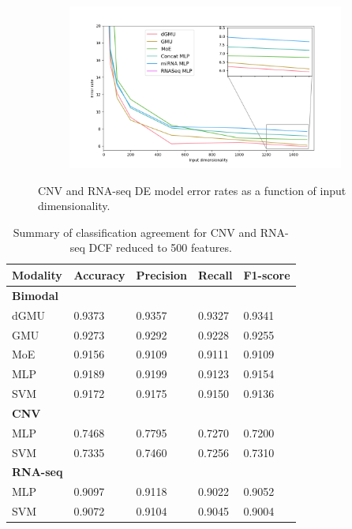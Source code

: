 \begin{figure}[H]
     \centering
     \begin{subfigure}[b]{\textwidth}
         \centering
         \includegraphics[width=\textwidth]{img/c_r/exp82.png}
     \end{subfigure}
        \caption{CNV and RNA-seq DE model error rates as a function of input dimensionality.}
        \label{fig:c_r_dcf_exp82}
\end{figure}

\begin{table}[H]
   \caption{Summary of classification agreement for CNV and RNA-seq DCF reduced to 500 features.} 
   \small %
   \centering %
   \begin{tabular}{lllll} %
   \toprule[\heavyrulewidth]\toprule[\heavyrulewidth]
   \textbf{Modality} & \textbf{Accuracy} & \textbf{Precision} & \textbf{Recall} & \textbf{F1-score} \\ 
   \midrule
   \multicolumn{1}{l}{\textbf{Bimodal}} \\
        dGMU & 0.9373 & 0.9357	& 0.9327 & 0.9341\\
        GMU  & 0.9273&	0.9292&	0.9228&	0.9255\\
        MoE  & 0.9156 &	0.9109 & 0.9111 & 0.9109\\
        MLP  & 0.9189 &	0.9199 & 0.9123 & 0.9154\\
        SVM  & 0.9172 &	0.9175 & 0.9150 & 0.9136\\
   \midrule
   \multicolumn{1}{l}{\textbf{CNV}} \\
        MLP  & 0.7468 &	0.7795 & 0.7270 & 0.7200\\
        SVM  & 0.7335 &	0.7460 & 0.7256 & 0.7310\\
   \midrule
   \multicolumn{1}{l}{\textbf{RNA-seq}}  \\
        MLP  & 0.9097 &	0.9118 & 0.9022 & 0.9052\\
        SVM  & 0.9072 &	0.9104 & 0.9045 & 0.9004\\
   \bottomrule[\heavyrulewidth] 
   \end{tabular}
   \label{table:c_r_dcf_exp41}
\end{table}


